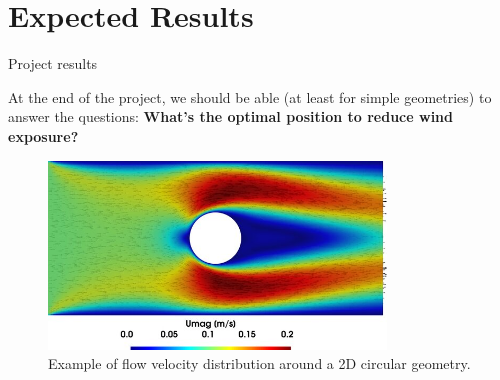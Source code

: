 \section{Expected Results}

\begin{frame}{Project results}

    At the end of the project, we should be able (at least for simple geometries) to answer the questions: \textbf{What's the optimal position to reduce wind exposure?}

    \vspace{9pt}

    \begin{figure}
        \centering
        \includegraphics[width=0.8\textwidth]{img/results.jpg}
        \caption{Example of flow velocity distribution around a 2D circular geometry.}
    \end{figure}

\end{frame}